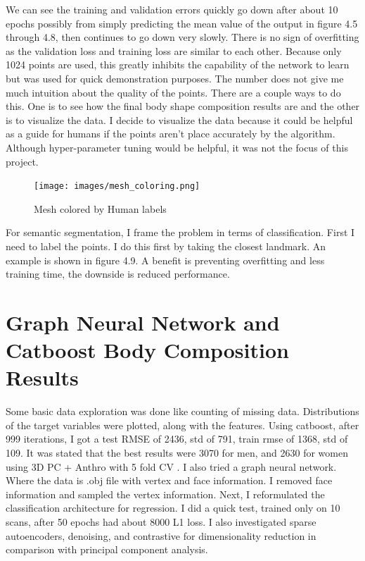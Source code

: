 We can see the training and validation errors quickly go down after about 10 epochs possibly from simply predicting the mean value of the output in figure 4.5 through 4.8, then continues to go down very slowly. There is no sign of overfitting as the validation loss and training loss are similar to each other. Because only 1024 points are used, this greatly inhibits the capability of the network to learn but was used for quick demonstration purposes. The number does not give me much intuition about the quality of the points. There are a couple ways to do this. One is to see how the final body shape composition results are and the other is to visualize the data. I decide to visualize the data because it could be helpful as a guide for humans if the points aren't place accurately by the algorithm. Although hyper-parameter tuning would be helpful, it was not the focus of this project. 

\begin{figure}[!htb]
	\caption{Mesh colored by Human labels}
	\centering
	\texttt{[image: images/mesh\_coloring.png]}
\end{figure}

For semantic segmentation, I frame the problem in terms of classification. First I need to label the points. I do this first by taking the closest landmark. An example is shown in figure 4.9. A benefit is preventing overfitting and less training time, the downside is reduced performance.

\section{Graph Neural Network and Catboost Body Composition Results}

Some basic data exploration was done like counting of missing data. Distributions of the target variables were plotted, along with the features. Using catboost, after 999 iterations, I got a test RMSE of 2436, std of 791, train rmse of 1368, std of 109. It was stated that the best results were 3070 for men, and 2630 for women using 3D PC + Anthro with 5 fold CV \cite{article}. I also tried a graph neural network. Where the data is .obj file with vertex and face information. I removed face information and sampled the vertex information. Next, I reformulated the classification architecture for regression. I did a quick test, trained only on 10 scans, after 50 epochs had about 8000 L1 loss. I also investigated sparse autoencoders, denoising, and contrastive for dimensionality reduction in comparison with principal component analysis.

